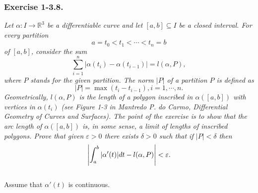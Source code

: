 \documentclass{article}
\begin{document}



\subsubsection*{Exercise 1-3.8.}
\emph{Let $\alpha: I \to \mathbb{R}^3$ be a differentiable curve and
let $[a,b] \subseteq I$ be a closed interval.
For every partition
\[
  a = t_0 < t_1 < \cdots < t_n = b
\]
of $[a,b]$, consider the sum
\[
  \sum_{i=1}^{n} |\alpha(t_i) - \alpha(t_{i-1})| = l(\alpha,P),
\]
where $P$ stands for the given partition.
The norm $|P|$ of a partition $P$ is defined as
\[
  |P| = \max(t_i - t_{i-1}), i = 1, \cdots, n.
\]
Geometrically, $l(\alpha,P)$ is the length of a polygon inscribed in $\alpha([a,b])$
with vertices in $\alpha(t_i)$
(see Figure 1-3 in Mantredo P. do Carmo, Differential Geometry of Curves and Surfaces).
The point of the exercise is to show that the arc length of $\alpha([a,b])$ is,
in some sense, a limit of lengths of inscribed polygons.
Prove that given $\varepsilon > 0$ there exists $\delta > 0$ such that
if $|P| < \delta$ then
\[
  \abs{ \int_{a}^{b} |\alpha'(t)|dt - l(\alpha,P) } < \varepsilon.
\]} \\

Assume that $\alpha'(t)$ is continuous. \\
\end{document}
